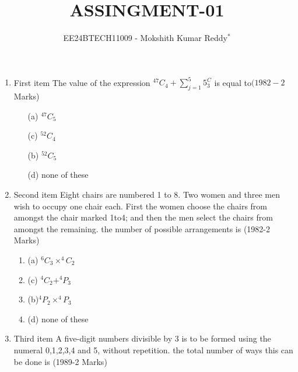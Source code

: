 \documentclass[journal,12pt,twocolumn]{IEEEtran}
\theoremstyle{remark}
\begin{document}

\vspace{3cm}

\title{ASSINGMENT-01}
\author{EE24BTECH11009 - Mokshith Kumar Reddy$^{*}$%
}
\maketitle
\newpage
\bigskip
\begin{enumerate}[start=3]
\item First item The value of the expression $^{47}C_4+\sum\limits_{j=1}^{5} 5^C_3$ is equal to\hfill{$(1982-2$ Marks)}\\
\begin{multicols}{2} 
\begin{enumerate}
[label=, left=0pt, labelsep=0pt, itemsep=1em]
\item[(a)] $^{47}C_5$
\item[(c)]$^{52}C_4$
\item[(b)] $^{52}C_5$
\item[(d)] none of these\\
\end{enumerate}
\end{multicols}
\item Second item Eight chairs are numbered 1 to 8. Two women and three men wish to occupy one chair each. First the women choose the chairs from amongst the chair marked 1to4; and then the men select the chairs from amongst the remaining. the number of possible arrangements is
\hfill{(1982-2 Marks)}\\
\begin{multicols}{2} 
\begin{enumerate}
[label=, left=0pt, labelsep=0pt, itemsep=1em]
\item(a) $^6C_3\times^4C_2$
\item(c) $^4C_2+^4P_3$
\item(b)$^4P_2\times^4P_3$
\item(d) none of these\\[4pt]
\end{enumerate}
\end{multicols}
\item Third item A five-digit numbers divisible by 3 is to be formed using the numeral 0,1,2,3,4 and 5, without repetition. the total number of ways this can be done is
\hfill{(1989-2 Marks)}\\
\begin{multicols}{2} 
\begin{enumerate}

\end{enumerate}
\end{multicols}
\end{enumerate}
\end{document}
